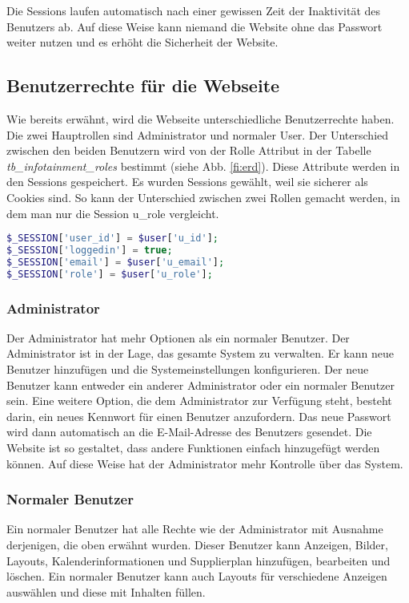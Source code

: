 Die Sessions laufen automatisch nach einer gewissen Zeit der Inaktivität des Benutzers ab. Auf diese Weise kann niemand die Website ohne das Passwort weiter nutzen und es erhöht die Sicherheit der Website.

\subsection{Benutzerrechte für die Webseite}
Wie bereits erwähnt, wird die Webseite unterschiedliche Benutzerrechte haben. Die zwei Hauptrollen sind Administrator und normaler User. Der Unterschied zwischen den beiden Benutzern wird von der Rolle Attribut in der Tabelle \textit{tb\_infotainment\_roles} bestimmt (siehe Abb. \ref{fi:erd}). Diese Attribute werden in den Sessions gespeichert. Es wurden Sessions gewählt, weil sie sicherer als Cookies sind. \cite{40_sessions_cookies} So kann der Unterschied zwischen zwei Rollen gemacht werden, in dem man nur die Session u\_role vergleicht.
\begin{lstlisting}[caption={Speicherung der Benutzer Informationen in Sessions},label={lst:sessions},language=PHP]
$_SESSION['user_id'] = $user['u_id'];
$_SESSION['loggedin'] = true;
$_SESSION['email'] = $user['u_email'];
$_SESSION['role'] = $user['u_role'];
\end{lstlisting}

\subsubsection{Administrator}
Der Administrator hat mehr Optionen als ein normaler Benutzer. Der Administrator ist in der Lage, das gesamte System zu verwalten. Er kann neue Benutzer hinzufügen und die Systemeinstellungen konfigurieren. Der neue Benutzer kann entweder ein anderer Administrator oder ein normaler Benutzer sein. Eine weitere Option, die dem Administrator zur Verfügung steht, besteht darin, ein neues Kennwort für einen Benutzer anzufordern. Das neue Passwort wird dann automatisch an die E-Mail-Adresse des Benutzers gesendet. Die Website ist so gestaltet, dass andere Funktionen einfach hinzugefügt werden können. Auf diese Weise hat der Administrator mehr Kontrolle über das System.

\subsubsection{Normaler Benutzer}
Ein normaler Benutzer hat alle Rechte wie der Administrator mit Ausnahme derjenigen, die oben erwähnt wurden. Dieser Benutzer kann Anzeigen, Bilder, Layouts, Kalenderinformationen und Supplierplan hinzufügen, bearbeiten und löschen. Ein normaler Benutzer kann auch Layouts für verschiedene Anzeigen auswählen und diese mit Inhalten füllen.


